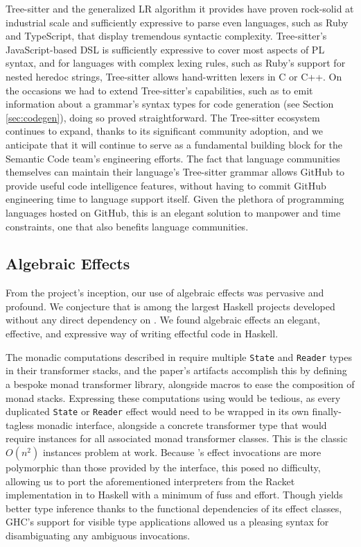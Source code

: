 \documentclass[acmsmall,fleqn]{acmart}
\begin{document}
Tree-sitter and the generalized LR algorithm it provides have proven
rock-solid at industrial scale and sufficiently expressive to parse even
languages, such as Ruby and TypeScript, that display tremendous syntactic
complexity. Tree-sitter's JavaScript-based DSL is sufficiently expressive to
cover most aspects of PL syntax, and for languages with complex lexing
rules, such as Ruby's support for nested heredoc strings, Tree-sitter allows
hand-written lexers in C or C++. On the occasions we had to extend
Tree-sitter's capabilities, such as to emit information about a grammar's
syntax types for code generation (see Section \ref{sec:codegen}), doing so
proved straightforward. The Tree-sitter ecosystem continues to expand,
thanks to its significant community adoption, and we anticipate that it will
continue to serve as a fundamental building block for the Semantic Code
team's engineering efforts. The fact that language communities themselves
can maintain their language's Tree-sitter grammar allows GitHub to provide
useful code intelligence features, without having to commit GitHub
engineering time to language support itself. Given the plethora of
programming languages hosted on GitHub, this is an elegant solution to
manpower and time constraints, one that also benefits language communities.

\subsection{Algebraic Effects}

From the project's inception, our use of algebraic effects was pervasive and
profound. We conjecture that \semantic{} is among the largest Haskell projects
developed without any direct dependency on \mtl{}. We found algebraic effects an
elegant, effective, and expressive way of writing effectful code in Haskell.

The monadic computations described in \citet{Darais17Abstracting} require
multiple \texttt{State} and \texttt{Reader} types in their transformer stacks,
and the paper's artifacts accomplish this by defining a bespoke monad
transformer library, alongside macros to ease the composition of monad stacks.
Expressing these computations using \mtl{} would be tedious, as every duplicated
\texttt{State} or \texttt{Reader} effect would need to be wrapped in its own
finally-tagless monadic interface, alongside a concrete transformer type that
would require instances for all associated monad transformer classes. This is
the classic $O(n^2)$ instances problem at work. Because \fe{}'s effect
invocations are more polymorphic than those provided by the \mtl{} interface,
this posed no difficulty, allowing us to port the aforementioned interpreters
from the Racket implementation in \citet{Darais17Abstracting} to Haskell with a
minimum of fuss and effort. Though \mtl{} yields better type inference thanks
to the functional dependencies of its effect classes, GHC's support
for visible type applications \cite{eisenberg16visible} allowed us a pleasing
syntax for disambiguating any ambiguous invocations.
\end{document}
